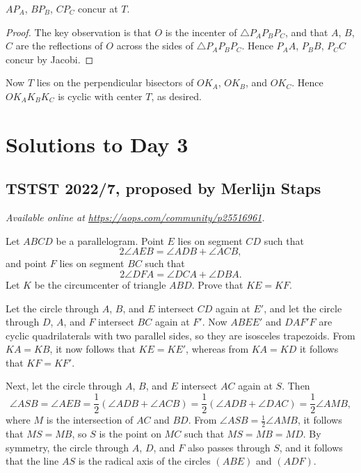 \documentclass[11pt]{scrartcl}
\begin{document}
\begin{claim*}
$AP_A$, $BP_B$, $CP_C$ concur at $T$.
\end{claim*}

\begin{proof}
The key observation is that $O$ is the incenter of $\triangle P_AP_BP_C$,
and that $A$, $B$, $C$ are the reflections of $O$ across the sides of $\triangle P_AP_BP_C$.
Hence $P_AA$, $P_BB$, $P_CC$ concur by Jacobi.
\end{proof}

Now $T$ lies on the perpendicular bisectors of $OK_A$, $OK_B$, and $OK_C$.
Hence $OK_AK_BK_C$ is cyclic with center $T$, as desired.
\pagebreak

\section{Solutions to Day 3}
\subsection{TSTST 2022/7, proposed by Merlijn Staps}
\textsl{Available online at \url{https://aops.com/community/p25516961}.}
\begin{mdframed}[style=mdpurplebox,frametitle={Problem statement}]
Let $ABCD$ be a parallelogram.
Point $E$ lies on segment $CD$ such that
\[ 2\angle AEB = \angle ADB+\angle ACB, \]
and point $F$ lies on segment $BC$ such that
\[ 2\angle DFA = \angle DCA + \angle DBA. \]
Let $K$ be the circumcenter of triangle $ABD$. Prove that $KE=KF$.
\end{mdframed}
Let the circle through $A$, $B$, and $E$ intersect $CD$ again at $E'$,
and let the circle through $D$, $A$, and $F$ intersect $BC$ again at $F'$.
Now $ABEE'$ and $DAF'F$ are cyclic quadrilaterals with two parallel sides,
so they are isosceles trapezoids.
From $KA=KB$, it now follows that $KE=KE'$,
whereas from $KA=KD$ it follows that $KF=KF'$.

Next, let the circle through $A$, $B$, and $E$ intersect $AC$ again at $S$.
Then
\[ \angle ASB = \angle AEB = \frac12(\angle ADB + \angle ACB)
  = \frac12(\angle ADB + \angle DAC) = \frac12 \angle AMB, \]
where $M$ is the intersection of $AC$ and $BD$.
From $\angle ASB = \frac12 \angle AMB$, it follows that $MS=MB$,
so $S$ is the point on $MC$ such that $MS=MB=MD$.
By symmetry, the circle through $A$, $D$, and $F$ also passes through $S$,
and it follows that the line $AS$ is the radical axis
of the circles $(ABE)$ and $(ADF)$.
\end{document}
